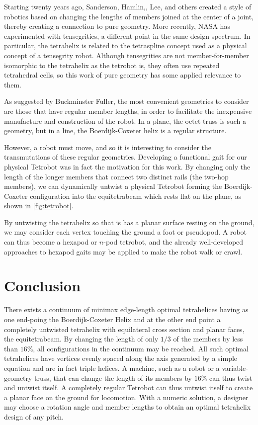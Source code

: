 \documentclass[twocolumn,10pt]{asme2ej}
\begin{document}
Starting twenty years ago, Sanderson\cite{sanderson1996modular},
Hamlin,\cite{TetrobotBook}, Lee\cite{lee2002dynamic}, and others
 created a style of robotics based on changing
the lengths of members joined at the center of a joint, thereby
creating a connection to pure geometry. More recently, NASA has
experimented with tensegrities\cite{NTRT,chen2017soft}, a different point in the
same design spectrum. In particular, the tetrahelix is related to the
tetraspline\cite{mirletz2014} concept used as a physical concept of a tensegrity robot.
Although tensegrities are not member-for-member isomorphic to the tetrahelix
as the tetrobot is, they often use repeated tetrahedral cells, so this
work of pure geometry has some applied relevance to them.

As suggested by Buckminster Fuller, the most convenient geometries to
consider are those that have regular member lengths, in order to
facilitate the inexpensive manufacture and construction of the robot.
In a plane, the octet truss\cite{richard1961synergetic} is such a geometry, but in a line, the
Boerdijk-Coxeter helix is a regular structure.

However, a robot must move, and so it is interesting to consider the
transmutations of these regular geometries. Developing a functional
gait for our physical Tetrobot was in fact the motivation
for this work.
By changing only the length of the longer members that connect two
distinct rails (the two-hop members), we can dynamically untwist a physical Tetrobot
forming the Boerdijk-Coxeter configuration into the equitetrabeam which rests flat on the plane,
as shown in \cref{fig:tetrobot}.

By untwisting the tetrahelix so that is has a planar surface resting on the ground,
we may consider each vertex touching the ground a foot or pseudopod. A robot can thus
become a hexapod or $n$-pod tetrobot, and the already well-developed approaches to
hexapod gaits may be applied to make the robot walk or crawl.

\section{Conclusion}

There exists a continuum of minimax edge-length optimal tetrahelices
having as one end-poing the Boerdijk-Coxeter Helix and at  the
other end point a completely untwisted tetrahelix with equilateral cross
section and planar faces, the equitetrabeam.
By changing the length of only $1/3$ of
the members by less than $16\%$, all configurations in the continuum may be reached.
All such optimal tetrahelices have vertices evenly
spaced along the axis generated by a simple equation and are in fact triple helices.
A machine, such as a robot or a variable-geometry truss, that can change
the length of its members by $16\%$ can thus twist and untwist itself.
A completely regular Tetrobot can thus untwist itself to create a planar
face on the ground for locomotion.
With a numeric solution, a designer may choose
a rotation angle and member lengths to obtain an optimal tetrahelix design
of any pitch.
\end{document}
